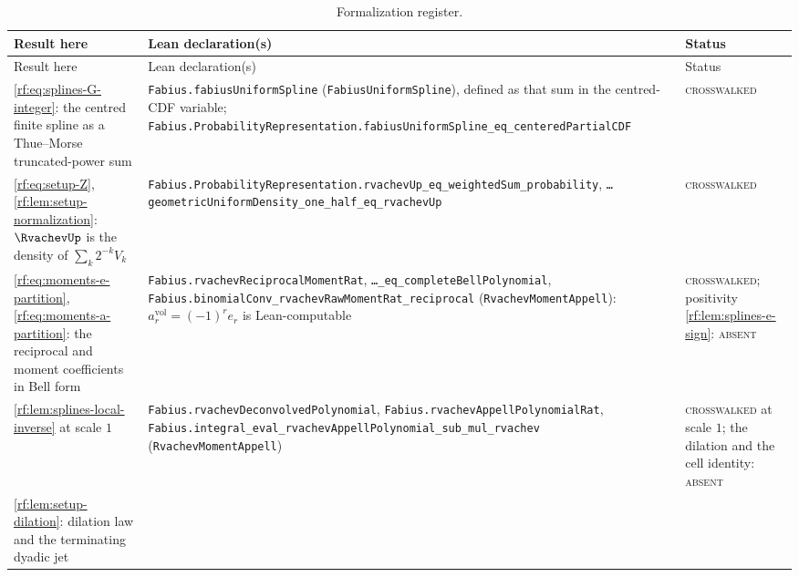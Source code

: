 \documentclass[11pt,oneside]{article}
\theoremstyle{plain}
\theoremstyle{definition}
\theoremstyle{remark}
\newcommand{\up}{\RvachevUp}                %
\newcommand{\amvol}[1]{a^{\mathrm{vol}}_{#1}} %
\begin{document}
\begin{center}
\small
\begin{longtable}{@{}>{\raggedright\arraybackslash}p{}>{\raggedright\arraybackslash}p{}>{\raggedright\arraybackslash}p{}@{}}
\caption{Formalization register.}\label{rf:tab:register}\\
\toprule
Result here & Lean declaration(s) & Status\\
\midrule
\endfirsthead
\toprule
Result here & Lean declaration(s) & Status\\
\midrule
\endhead
\cref{rf:eq:splines-G-integer}: the centred finite spline as a Thue--Morse truncated-power sum
& \texttt{Fabius.\allowbreak{}fabiusUniformSpline} (\texttt{FabiusUniformSpline}), defined as that sum in the centred-CDF variable; \texttt{Fabius.\allowbreak{}ProbabilityRepresentation.\allowbreak fabiusUniformSpline\_\allowbreak{}eq\_\allowbreak{}centeredPartialCDF}
& \textsc{crosswalked}\\[0.3em]
\cref{rf:eq:setup-Z}, \cref{rf:lem:setup-normalization}: $\up$ is the density of $\sum_{k}2^{-k}V_{k}$
& \texttt{Fabius.\allowbreak{}ProbabilityRepresentation.\allowbreak rvachevUp\_\allowbreak{}eq\_\allowbreak{}weightedSum\_\allowbreak{}probability}, \texttt{\ldots geometricUniformDensity\_\allowbreak{}one\_\allowbreak{}half\_\allowbreak{}eq\_\allowbreak{}rvachevUp}
& \textsc{crosswalked}\\[0.3em]
\cref{rf:eq:moments-e-partition}, \cref{rf:eq:moments-a-partition}: the reciprocal and moment coefficients in Bell form
& \texttt{Fabius.\allowbreak{}rvachevReciprocalMomentRat}, \texttt{\ldots\_\allowbreak{}eq\_\allowbreak{}completeBellPolynomial}, \texttt{Fabius.\allowbreak{}binomialConv\_\allowbreak{}rvachevRawMomentRat\_\allowbreak{}reciprocal} (\texttt{RvachevMomentAppell}): $\amvol{r}=(-1)^{r}e_{r}$ is Lean-computable
& \textsc{crosswalked}; positivity \cref{rf:lem:splines-e-sign}: \textsc{absent}\\[0.3em]
\cref{rf:lem:splines-local-inverse} at scale $1$
& \texttt{Fabius.\allowbreak{}rvachevDeconvolvedPolynomial}, \texttt{Fabius.\allowbreak{}rvachevAppellPolynomialRat}, \texttt{Fabius.\allowbreak{}integral\_\allowbreak{}eval\_\allowbreak{}rvachevAppellPolynomial\_\allowbreak{}sub\_\allowbreak{}mul\_\allowbreak{}rvachev} (\texttt{RvachevMomentAppell})
& \textsc{crosswalked} at scale $1$; the dilation and the cell identity: \textsc{absent}\\[0.3em]
\cref{rf:lem:setup-dilation}: dilation law and the terminating dyadic jet

\end{longtable}
\end{center}
\end{document}
